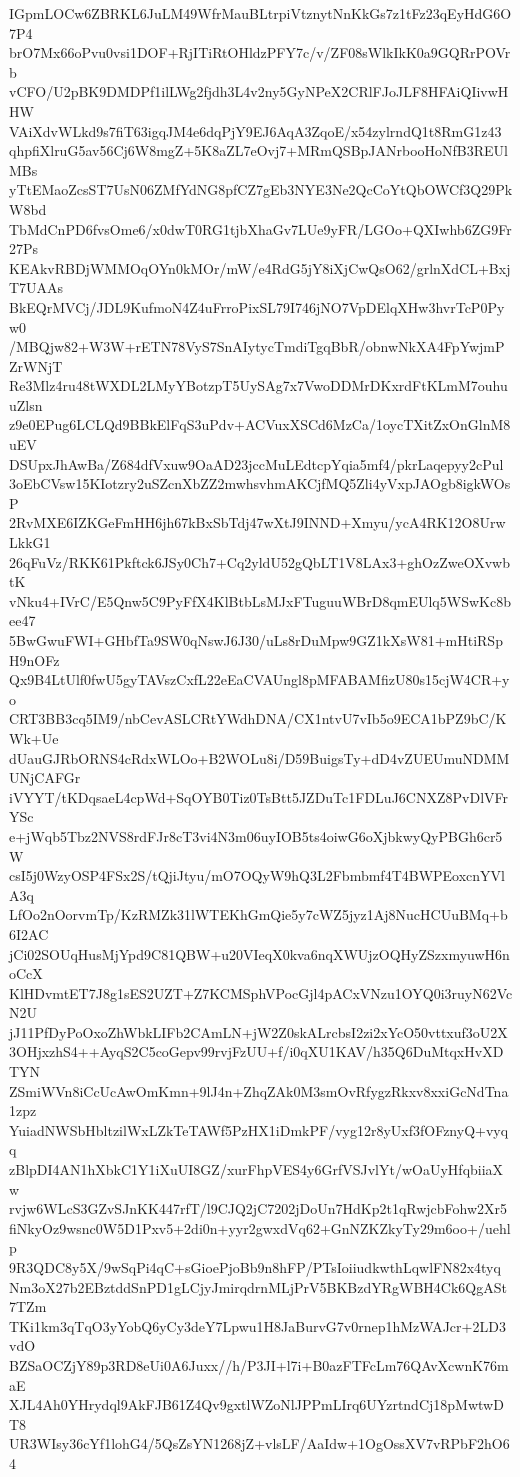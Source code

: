 IGpmLOCw6ZBRKL6JuLM49WfrMauBLtrpiVtznytNnKkGs7z1tFz23qEyHdG6O7P4
brO7Mx66oPvu0vsi1DOF+RjITiRtOHldzPFY7c/v/ZF08sWlkIkK0a9GQRrPOVrb
vCFO/U2pBK9DMDPf1ilLWg2fjdh3L4v2ny5GyNPeX2CRlFJoJLF8HFAiQIivwHHW
VAiXdvWLkd9s7fiT63igqJM4e6dqPjY9EJ6AqA3ZqoE/x54zylrndQ1t8RmG1z43
qhpfiXlruG5av56Cj6W8mgZ+5K8aZL7eOvj7+MRmQSBpJANrbooHoNfB3REUlMBs
yTtEMaoZcsST7UsN06ZMfYdNG8pfCZ7gEb3NYE3Ne2QcCoYtQbOWCf3Q29PkW8bd
TbMdCnPD6fvsOme6/x0dwT0RG1tjbXhaGv7LUe9yFR/LGOo+QXIwhb6ZG9Fr27Ps
KEAkvRBDjWMMOqOYn0kMOr/mW/e4RdG5jY8iXjCwQsO62/grlnXdCL+BxjT7UAAs
BkEQrMVCj/JDL9KufmoN4Z4uFrroPixSL79I746jNO7VpDElqXHw3hvrTcP0Pyw0
/MBQjw82+W3W+rETN78VyS7SnAIytycTmdiTgqBbR/obnwNkXA4FpYwjmPZrWNjT
Re3Mlz4ru48tWXDL2LMyYBotzpT5UySAg7x7VwoDDMrDKxrdFtKLmM7ouhuuZlsn
z9e0EPug6LCLQd9BBkElFqS3uPdv+ACVuxXSCd6MzCa/1oycTXitZxOnGlnM8uEV
DSUpxJhAwBa/Z684dfVxuw9OaAD23jccMuLEdtcpYqia5mf4/pkrLaqepyy2cPul
3oEbCVsw15KIotzry2uSZcnXbZZ2mwhsvhmAKCjfMQ5Zli4yVxpJAOgb8igkWOsP
2RvMXE6IZKGeFmHH6jh67kBxSbTdj47wXtJ9INND+Xmyu/ycA4RK12O8UrwLkkG1
26qFuVz/RKK61Pkftck6JSy0Ch7+Cq2yldU52gQbLT1V8LAx3+ghOzZweOXvwbtK
vNku4+IVrC/E5Qnw5C9PyFfX4KlBtbLsMJxFTuguuWBrD8qmEUlq5WSwKc8bee47
5BwGwuFWI+GHbfTa9SW0qNswJ6J30/uLs8rDuMpw9GZ1kXsW81+mHtiRSpH9nOFz
Qx9B4LtUlf0fwU5gyTAVszCxfL22eEaCVAUngl8pMFABAMfizU80s15cjW4CR+yo
CRT3BB3cq5IM9/nbCevASLCRtYWdhDNA/CX1ntvU7vIb5o9ECA1bPZ9bC/KWk+Ue
dUauGJRbORNS4cRdxWLOo+B2WOLu8i/D59BuigsTy+dD4vZUEUmuNDMMUNjCAFGr
iVYYT/tKDqsaeL4cpWd+SqOYB0Tiz0TsBtt5JZDuTc1FDLuJ6CNXZ8PvDlVFrYSc
e+jWqb5Tbz2NVS8rdFJr8cT3vi4N3m06uyIOB5ts4oiwG6oXjbkwyQyPBGh6cr5W
csI5j0WzyOSP4FSx2S/tQjiJtyu/mO7OQyW9hQ3L2Fbmbmf4T4BWPEoxcnYVlA3q
LfOo2nOorvmTp/KzRMZk31lWTEKhGmQie5y7cWZ5jyz1Aj8NucHCUuBMq+b6I2AC
jCi02SOUqHusMjYpd9C81QBW+u20VIeqX0kva6nqXWUjzOQHyZSzxmyuwH6noCcX
KlHDvmtET7J8g1sES2UZT+Z7KCMSphVPocGjl4pACxVNzu1OYQ0i3ruyN62VcN2U
jJ11PfDyPoOxoZhWbkLIFb2CAmLN+jW2Z0skALrcbsI2zi2xYcO50vttxuf3oU2X
3OHjxzhS4++AyqS2C5coGepv99rvjFzUU+f/i0qXU1KAV/h35Q6DuMtqxHvXDTYN
ZSmiWVn8iCcUcAwOmKmn+9lJ4n+ZhqZAk0M3smOvRfygzRkxv8xxiGcNdTna1zpz
YuiadNWSbHbltzilWxLZkTeTAWf5PzHX1iDmkPF/vyg12r8yUxf3fOFznyQ+vyqq
zBlpDI4AN1hXbkC1Y1iXuUI8GZ/xurFhpVES4y6GrfVSJvlYt/wOaUyHfqbiiaXw
rvjw6WLcS3GZvSJnKK447rfT/l9CJQ2jC7202jDoUn7HdKp2t1qRwjcbFohw2Xr5
fiNkyOz9wsnc0W5D1Pxv5+2di0n+yyr2gwxdVq62+GnNZKZkyTy29m6oo+/uehlp
9R3QDC8y5X/9wSqPi4qC+sGioePjoBb9n8hFP/PTsIoiiudkwthLqwlFN82x4tyq
Nm3oX27b2EBztddSnPD1gLCjyJmirqdrnMLjPrV5BKBzdYRgWBH4Ck6QgASt7TZm
TKi1km3qTqO3yYobQ6yCy3deY7Lpwu1H8JaBurvG7v0rnep1hMzWAJcr+2LD3vdO
BZSaOCZjY89p3RD8eUi0A6Juxx//h/P3JI+l7i+B0azFTFcLm76QAvXcwnK76maE
XJL4Ah0YHrydql9AkFJB61Z4Qv9gxtlWZoNlJPPmLIrq6UYzrtndCj18pMwtwDT8
UR3WIsy36cYf1lohG4/5QsZsYN1268jZ+vlsLF/AaIdw+1OgOssXV7vRPbF2hO64
